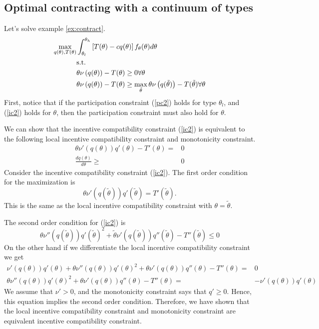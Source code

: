 \begin{example}[Epidemic]
  
\end{example}

\subsection{Optimal contracting with a continuum of types} 
Let's solve example \ref{ex:contract}. 
\begin{align}
  \max_{q(\theta),T(\theta)} & \int_{\theta_l}^{\theta_h} 
  \left[T(\theta) - cq(\theta)\right]
  f_\theta(\theta) d\theta \notag \\
  & \text{s.t.} \notag \\
  &\theta \nu\left(q(\theta)\right) - T(\theta) \geq 0  \forall
  \theta \label{pc2} \\
  &\theta \nu\left(q(\theta)\right) - T(\theta) \geq
  \max_{\tilde{\theta}} \theta \nu\left(q(\tilde{\theta}) \right) -
  T(\tilde{\theta}) \forall \theta \label{ic2} 
\end{align}
First, notice that if the participation constraint (\ref{pc2}) holds for type
$\theta_l$, and (\ref{ic2}) holds for $\theta$, then the participation
constraint must also hold for $\theta$. 

We can show that the incentive compatibility constraint (\ref{ic2}) is
equivalent to the following local incentive 
compatibility constraint and monotonicity constraint.
\begin{align}
  \theta \nu'(q(\theta))q'(\theta) - T'(\theta) = & 0 \label{lic} \\
  \frac{dq(\theta)}{d\theta} \geq & 0 \label{mon}
\end{align}
Consider the incentive compatibility constraint
(\ref{ic2}). The first order condition for the maximization is
\[ \theta \nu'(q(\tilde{\theta})) q'(\tilde{\theta}) =
T'(\tilde{\theta}). \]
This is the same as the local incentive compatibility constraint with
$\theta = \tilde{\theta}$.

The second order condition for (\ref{ic2}) is 
\[ \theta \nu''(q(\tilde{\theta}))q'(\tilde{\theta})^2 +
\tilde{\theta} \nu'(q(\tilde{\theta})) q''(\tilde{\theta}) -
T''(\tilde{\theta}) \leq 0 \]   
On the other hand if we differentiate the local incentive
compatibility constraint we get 
\begin{align*}
  \nu'(q(\theta))q'(\theta) + \theta \nu''(q(\theta)) q'(\theta)^2 + \theta
  \nu'(q(\theta)) q''(\theta) - T''(\theta) = & 0 \\
  \theta \nu''(q(\theta)) q'(\theta)^2 + \theta
  \nu'(q(\theta)) q''(\theta) - T''(\theta) = & -\nu'(q(\theta))q'(\theta)  
\end{align*}
We assume that $\nu'>0$, and the monotonicity constraint says that
$q'\geq 0$. Hence, this equation implies the second order
condition. Therefore, we have shown that the local incentive
compatibility constraint and monotonicity constraint are equivalent
incentive compatibility constraint.

